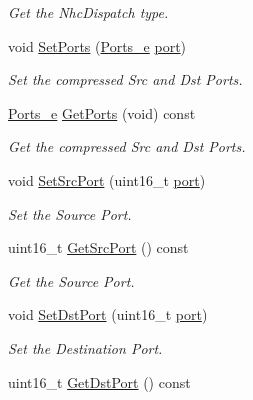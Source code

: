 \begin{DoxyCompactItemize}
\begin{DoxyCompactList}\small\item\em Get the Nhc\+Dispatch type. \end{DoxyCompactList}\item 
void \hyperlink{classns3_1_1SixLowPanUdpNhcExtension_a7c8a686962bc5732cf8a6635111cbb49}{Set\+Ports} (\hyperlink{classns3_1_1SixLowPanUdpNhcExtension_a77005f9c06de72b1a6ea105a23bf413b}{Ports\+\_\+e} \hyperlink{visualizer-ideas_8txt_a21ff1c530daf8435e00048b7fc2c58e3}{port})
\begin{DoxyCompactList}\small\item\em Set the compressed Src and Dst Ports. \end{DoxyCompactList}\item 
\hyperlink{classns3_1_1SixLowPanUdpNhcExtension_a77005f9c06de72b1a6ea105a23bf413b}{Ports\+\_\+e} \hyperlink{classns3_1_1SixLowPanUdpNhcExtension_a5ffeb18eeb20b2dfbe72c7bca3eeb32e}{Get\+Ports} (void) const 
\begin{DoxyCompactList}\small\item\em Get the compressed Src and Dst Ports. \end{DoxyCompactList}\item 
void \hyperlink{classns3_1_1SixLowPanUdpNhcExtension_aca13997b0fb72c52e3ca5ea32e5da617}{Set\+Src\+Port} (uint16\+\_\+t \hyperlink{visualizer-ideas_8txt_a21ff1c530daf8435e00048b7fc2c58e3}{port})
\begin{DoxyCompactList}\small\item\em Set the Source Port. \end{DoxyCompactList}\item 
uint16\+\_\+t \hyperlink{classns3_1_1SixLowPanUdpNhcExtension_ad5591833289c57f4d0dc8cada4432d28}{Get\+Src\+Port} () const 
\begin{DoxyCompactList}\small\item\em Get the Source Port. \end{DoxyCompactList}\item 
void \hyperlink{classns3_1_1SixLowPanUdpNhcExtension_ac30f039f69f113a500f82f0d5f7280fd}{Set\+Dst\+Port} (uint16\+\_\+t \hyperlink{visualizer-ideas_8txt_a21ff1c530daf8435e00048b7fc2c58e3}{port})
\begin{DoxyCompactList}\small\item\em Set the Destination Port. \end{DoxyCompactList}\item 
uint16\+\_\+t \hyperlink{classns3_1_1SixLowPanUdpNhcExtension_a1a003a3a62215fff50100f93af4c8afb}{Get\+Dst\+Port} () const 

\end{DoxyCompactItemize}
